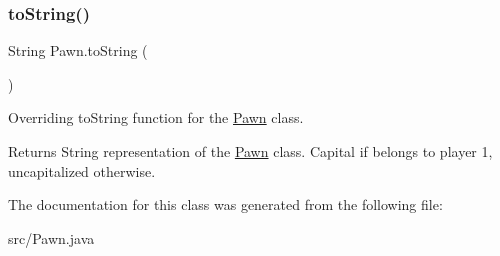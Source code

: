 \subsubsection{\texorpdfstring{to\+String()}{toString()}}
{\footnotesize\ttfamily String Pawn.\+to\+String (\begin{DoxyParamCaption}{ }\end{DoxyParamCaption})}

Overriding to\+String function for the \mbox{\hyperlink{class_pawn}{Pawn}} class. \begin{DoxyReturn}{Returns}
String representation of the \mbox{\hyperlink{class_pawn}{Pawn}} class. Capital if belongs to player 1, uncapitalized otherwise. 
\end{DoxyReturn}


The documentation for this class was generated from the following file\+:\begin{DoxyCompactItemize}
\item 
src/Pawn.\+java\end{DoxyCompactItemize}
